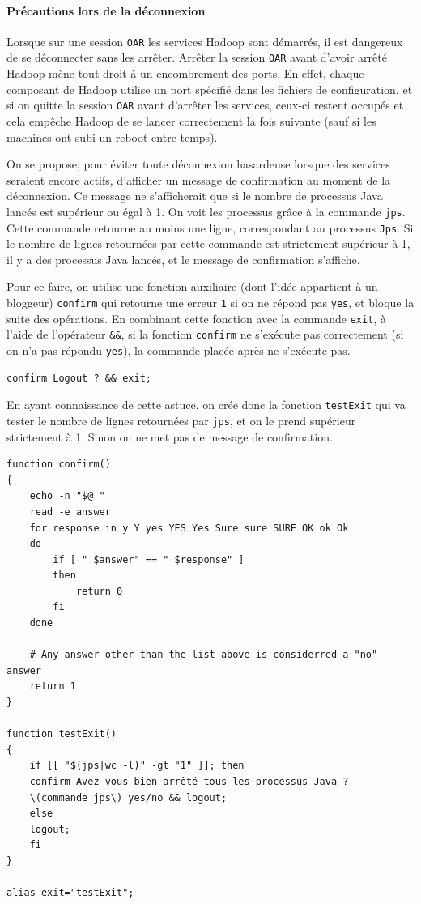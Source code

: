 \paragraph{Précautions lors de la déconnexion}
\label{sec:precautions-lors-de}

\par Lorsque sur une session \texttt{OAR} les services Hadoop sont démarrés, il est dangereux de se déconnecter sans les arrêter. Arrêter la session \texttt{OAR} avant d'avoir arrêté Hadoop mène tout droit à un encombrement des ports. En effet, chaque composant de Hadoop utilise un port spécifié dans les fichiers de configuration, et si on quitte la session \texttt{OAR} avant d'arrêter les services, ceux-ci restent occupés et cela empêche Hadoop de se lancer correctement la fois suivante (sauf si les machines ont subi un reboot entre temps).

\par On se propose, pour éviter toute déconnexion hasardeuse lorsque des services seraient encore actifs, d'afficher un message de confirmation au moment de la déconnexion. Ce message ne s'afficherait que si le nombre de processus Java lancés est supérieur ou égal à 1. On voit les processus grâce à la commande \texttt{jps}. Cette commande retourne au moins une ligne, correspondant au processus \texttt{Jps}. Si le nombre de lignes retournées par cette commande est strictement supérieur à 1, il y a des processus Java lancés, et le message de confirmation s'affiche.

\par Pour ce faire, on utilise une fonction auxiliaire (dont l'idée appartient à un bloggeur) \texttt{confirm} qui retourne une erreur \texttt{1} si on ne répond pas \texttt{yes}, et bloque la suite des opérations. En combinant cette fonction avec la commande \texttt{exit}, à l'aide de l'opérateur \texttt{&&}, si la fonction \texttt{confirm} ne s'exécute pas correctement (si on n'a pas répondu \texttt{yes}), la commande placée après ne s'exécute pas.
\begin{verbatim}
confirm Logout ? && exit;
\end{verbatim}

\par En ayant connaissance de cette astuce, on crée donc la fonction \texttt{testExit} qui va tester le nombre de lignes retournées par \texttt{jps}, et on le prend supérieur strictement à 1. Sinon on ne met pas de message de confirmation.
\begin{verbatim}
function confirm()
{
    echo -n "$@ "
    read -e answer
    for response in y Y yes YES Yes Sure sure SURE OK ok Ok
    do
        if [ "_$answer" == "_$response" ]
        then
            return 0
        fi
    done
 
    # Any answer other than the list above is considerred a "no" answer
    return 1
}

function testExit()
{
    if [[ "$(jps|wc -l)" -gt "1" ]]; then
    confirm Avez-vous bien arrêté tous les processus Java ? 
    \(commande jps\) yes/no && logout;
    else
	logout;
    fi
}

alias exit="testExit";
\end{verbatim}

